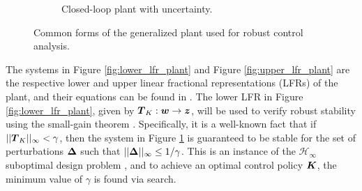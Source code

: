 \begin{figure}[H]
\begin{subfigure}{0.4\textwidth}
{
    }
    \caption{\small Closed-loop plant with uncertainty.}
    \label{fig:closed_loop_plant}
\end{subfigure}

\caption{Common forms of the generalized plant used for robust control analysis.}
\label{fig:robust_plant_diagrams}
\end{figure}

The systems in Figure \ref{fig:lower_lfr_plant} and Figure \ref{fig:upper_lfr_plant} are the respective lower and upper linear fractional representations (LFRs) of the plant, and their equations can be found in \cite{doyle1991review}.  The lower LFR in Figure \ref{fig:lower_lfr_plant}, given by $\vb*{T}_{K}: \vb*{w} \rightarrow \vb*{z}$, will be used to verify robust stability using the small-gain theorem \cite{sandberg1964frequency, zames1966input}.  Specifically, it is a well-known fact that if $||\vb*{T}_{K}||_{\infty} < \gamma$, then the system in Figure \ref{fig:closed_loop_plant} is guaranteed to be stable for the set of perturbations $\vb*{\Delta}$ such that $||\vb*{\Delta}||_{\infty} \leq 1/\gamma$.  This is an instance of the $\mathcal{H}_{\infty}$ suboptimal design problem \cite{basar1989dynamic, bacsar2008h}, and to achieve an optimal control policy $\vb*{K}$, the minimum value of $\gamma$ is found via search.

